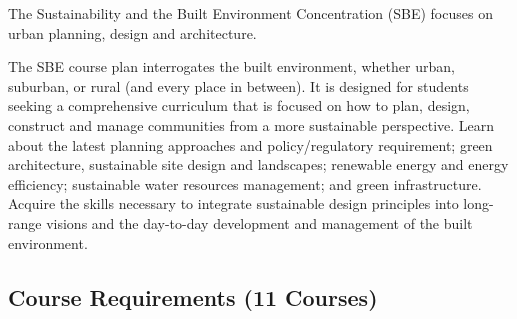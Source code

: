 \documentclass{article}\usepackage[]{graphicx}\usepackage[]{xcolor}
\begin{document}
The Sustainability and the Built Environment Concentration (SBE) focuses on urban planning, design and architecture. 

The SBE course plan interrogates the built environment, whether urban, suburban, or rural (and every place in between). It is designed for students seeking a comprehensive curriculum that is focused on how to plan, design, construct and manage communities from a more sustainable perspective. Learn about the latest planning approaches and policy/regulatory requirement; green architecture, sustainable site design and landscapes; renewable energy and energy efficiency; sustainable water resources management; and green infrastructure. Acquire the skills necessary to integrate sustainable design principles into long-range visions and the day-to-day development and management of the built environment.


\subsection{Course Requirements (11 Courses)}
\end{document}
